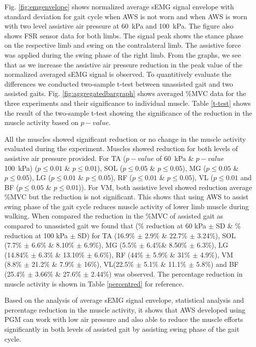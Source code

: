 \documentclass[letterpaper, 10 pt, conference]{ieeeconf}  %
\begin{document}
Fig. \ref{fig:emgenvelope} shows normalized average sEMG signal envelope with standard deviation for gait cycle when AWS is not worn and when AWS is worn with two level assistive air pressure at \SI{60}{\kilo\pascal} and \SI{100}{\kilo\pascal}. The figure also shows FSR sensor data for both limbs. The signal peak shows the stance phase on the respective limb and swing on the contralateral limb. The assistive force was applied during the swing phase of the right limb. From the graphs, we see that as we increase the assistive air pressure reduction in the peak value of the normalized averaged sEMG signal is observed. To quantitively evaluate the differences we conducted two-sample t-test between unassisted gait and two assisted gaits. Fig. \ref{fig:aggregatedbargraph} shows averaged \%MVC data for the three experiments and their significance to individual muscle. Table \ref{t-test} shows the result of the two-sample t-test showing the significance of the reduction in the muscle activity based on $p-value$. 

All the muscles showed significant reduction or no change in the muscle activity evaluated during the experiment. Muscles showed reduction for both levels of assistive air pressure provided. For TA ($p-value$ of \SI{60}{\kilo\pascal} \& $p-value$  \SI{100}{\kilo\pascal}) ($p\le0.01$ \& $p\le0.01$), SOL ($p\le0.05$ \& $p\le0.05$), MG ($p\le0.05$ \& $p\le0.05$), LG ($p\le0.01$ \& $p\le0.05$), RF ($p\le0.01$ \& $p\le0.05$), VL ($p\le0.01$ and BF ($p\le0.05$ \& $p\le0.01$)). For VM, both assistive level showed reduction average \%MVC but the reduction is not significant. This shows that using AWS to assist swing phase of the gait cycle reduces muscle activity of lower limb muscle during walking. When compared the reduction in the \%MVC of assisted gait as compared to unassisted gait we found that (\% reduction at 60 kPa $\pm$ SD \& \% reduction at 100 kPa $\pm$ SD) for TA (16.9\% $\pm$ 2.9\% \& 22.7\% $\pm$ 3.24\%), SOL (7.7\% $\pm$ 6.6\% \& 8.10\% $\pm$ 6.9\%), MG (5.5\% $\pm$ 6.4\%\& 8.50\% $\pm$ 6.3\%), LG (14.84\% $\pm$ 6.3\% \& 13.10\% $\pm$ 6.6\%), RF (44\% $\pm$ 5.9\% \& 31\% $\pm$ 4.9\%), VM (8.8\% $\pm$ 21.2\% \& 7.9\% $\pm$ 16\%), VL(22.5\% $\pm$ 5.1\% \& 11.1\% $\pm$ 5.8\%) and BF (25.4\% $\pm$ 3.66\% \& 27.6\% $\pm$ 2.44\%) was observed. The percentage reduction in muscle activity is shown in Table \ref{percentred} for reference. 

Based on the analysis of average sEMG signal envelope, statistical analysis and percentage reduction in the muscle activity, it shows that AWS developed using PGM can work with low air pressure and also able to reduce the muscle efforts significantly in both levels of assisted gait by assisting swing phase of the gait cycle. 
\end{document}
